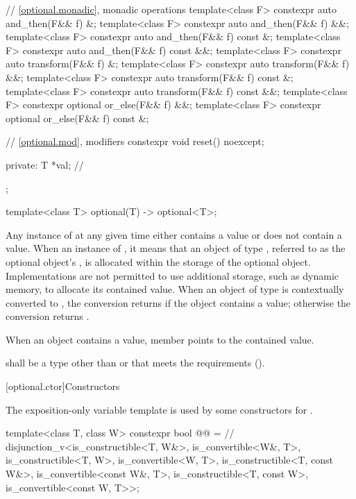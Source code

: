 \begin{codeblock}
{{    // \ref{optional.monadic}, monadic operations
    template<class F> constexpr auto and_then(F&& f) &;
    template<class F> constexpr auto and_then(F&& f) &&;
    template<class F> constexpr auto and_then(F&& f) const &;
    template<class F> constexpr auto and_then(F&& f) const &&;
    template<class F> constexpr auto transform(F&& f) &;
    template<class F> constexpr auto transform(F&& f) &&;
    template<class F> constexpr auto transform(F&& f) const &;
    template<class F> constexpr auto transform(F&& f) const &&;
    template<class F> constexpr optional or_else(F&& f) &&;
    template<class F> constexpr optional or_else(F&& f) const &;

    // \ref{optional.mod}, modifiers
    constexpr void reset() noexcept;

  private:
    T *val;         // \expos
  };

  template<class T>
    optional(T) -> optional<T>;
}
\end{codeblock}

\pnum
Any instance of  at any given time either contains a value or does not contain a value.
When an instance of  ,
it means that an object of type , referred to as the optional object's ,
is allocated within the storage of the optional object.
Implementations are not permitted to use additional storage, such as dynamic memory, to allocate its contained value.
When an object of type  is contextually converted to ,
the conversion returns  if the object contains a value;
otherwise the conversion returns .

\pnum
When an  object contains a value,
member  points to the contained value.

\pnum
{} shall be a type
other than \cv{}  or \cv{} 
that meets the  requirements ().

[optional.ctor]{Constructors}

\pnum
The exposition-only variable template 
is used by some constructors for .
\begin{codeblock}
template<class T, class W>
constexpr bool @@ =  // \expos
  disjunction_v<is_constructible<T, W&>, is_convertible<W&, T>,
                is_constructible<T, W>, is_convertible<W, T>,
                is_constructible<T, const W&>, is_convertible<const W&, T>,
                is_constructible<T, const W>, is_convertible<const W, T>>;
\end{codeblock}

